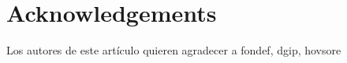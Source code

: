  \section{Acknowledgements}
 Los autores de este artículo quieren agradecer a fondef, dgip, hovsore
